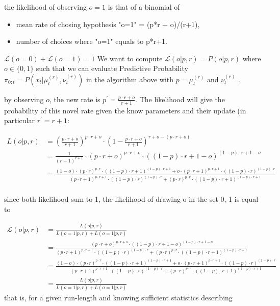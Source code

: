 \documentclass[12pt,english]{article}%
\newcommand{\eqs}[1]{\begin{align*}#1\end{align*}}
\newcommand{\Ll}{\mathcal{L}}
\begin{document}
the likelihood of observing $o=1$ is that of a binomial of
	\begin{itemize}
		\item  mean rate of chosing hypothesis "o=1" = (p*r + o)/(r+1),
		\item number of choices where  "o=1" equals to p*r+1.
	\end{itemize}




$\Ll(o=0)+\Ll(o=1)=1$
We want to compute $\Ll(o| p, r) = P(o | p, r)$ where $o \in \{ 0, 1 \}$ such that we can evaluate Predictive Probability $\pi_{0:t} = P(x_t |\mu^{(r)}_t,\nu^{(r)}_t)$ in the algorithm above with $p=\mu^{(r)}_t$ and $\nu^{(r)}_t$ .

by observing $o$, the new rate is $p^{'} = \frac{p\cdot r + o}{r+1}$.
The likelihood will give the probability of this novel rate given the know parameters and their update (in particular $r^{'}=r+1$:


\eqs{
L(o | p, r)&={(\frac{p\cdot r + o}{r+1})}^{p\cdot r + o} \cdot (1-\frac{p\cdot r + o}{r+1})^{r + o - (p\cdot r + o)} \\
&= \frac{1}{({r+1})^{r+1}} \cdot {(p\cdot r + o)}^{p\cdot r + o}  \cdot {((1- p)\cdot r + 1- o)}^{(1- p)\cdot r + 1- o} \\
&= \frac{ (1-o) \cdot {(p\cdot r)}^{p\cdot r}  \cdot {((1- p)\cdot r + 1)}^{(1- p)\cdot r + 1}
+ o \cdot {(p\cdot r + 1)}^{p\cdot r + 1}  \cdot {((1- p)\cdot r)}^{(1- p)\cdot r}
 }{
 {(p\cdot r + 1)}^{p\cdot r + 1}  \cdot {((1- p)\cdot r )}^{(1- p)\cdot r }  +
  {(p\cdot r )}^{p\cdot r }  \cdot {((1- p)\cdot r + 1)}^{(1- p)\cdot r + 1}
}  \\
}

    since both likelihood sum to 1, the likelihood of drawing o in the set {0, 1}
    is equal to

\eqs{
\Ll(o | p, r)&=\frac{L(o | p, r)}{L(o=1 | p, r) + L(o=1 | p, r)}  \\
&= \frac{ {(p\cdot r + o)}^{p\cdot r + o}  \cdot {((1- p)\cdot r + 1- o)}^{(1- p)\cdot r + 1- o} }{
 {(p\cdot r + 1)}^{p\cdot r + 1}  \cdot {((1- p)\cdot r )}^{(1- p)\cdot r }  +
  {(p\cdot r )}^{p\cdot r }  \cdot {((1- p)\cdot r + 1)}^{(1- p)\cdot r + 1}
}  \\
&= \frac{ (1-o) \cdot {(p\cdot r)}^{p\cdot r}  \cdot {((1- p)\cdot r + 1)}^{(1- p)\cdot r + 1}
+ o \cdot {(p\cdot r + 1)}^{p\cdot r + 1}  \cdot {((1- p)\cdot r)}^{(1- p)\cdot r}
 }{
 {(p\cdot r + 1)}^{p\cdot r + 1}  \cdot {((1- p)\cdot r )}^{(1- p)\cdot r }  +
  {(p\cdot r )}^{p\cdot r }  \cdot {((1- p)\cdot r + 1)}^{(1- p)\cdot r + 1}
}  \\
&=  \frac{L(o | p, r)}{L(o=1 | p, r) + L(o=1 | p, r)}
}
that is, for a given run-length and knowing sufficient statistics describing
\end{document}
